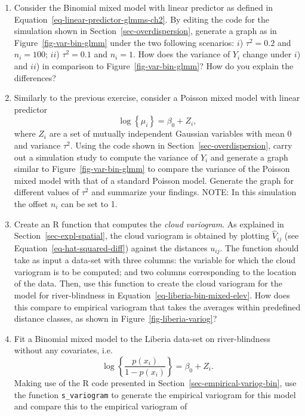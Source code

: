 \documentclass[
  letterpaper,
]{krantz}
\begin{document}
\begin{enumerate}
\def\labelenumi{\arabic{enumi}.}
\setcounter{enumi}{1}
\item
  Consider the Binomial mixed model with linear predictor as defined in
  Equation~\ref{eq-linear-predictor-glmms-ch2}. By editing the code for
  the simulation shown in Section~\ref{sec-overdispersion}, generate a
  graph as in Figure~\ref{fig-var-bin-glmm} under the two following
  scenarios: \(i\)) \(\tau^2 = 0.2\) and \(n_i=100\); \(ii\))
  \(\tau^2 = 0.1\) and \(n_i = 1\). How does the variance of \(Y_i\)
  change under \(i\)) and \(ii\)) in comparison to
  Figure~\ref{fig-var-bin-glmm}? How do you explain the differences?
\item
  Similarly to the previous exercise, consider a Poisson mixed model
  with linear predictor \[
  \log\left\{\mu_i\right\} = \beta_0 + Z_i,
  \] where \(Z_i\) are a set of mutually independent Gaussian variables
  with mean 0 and variance \(\tau^2\). Using the code shown in
  Section~\ref{sec-overdispersion}, carry out a simulation study to
  compute the variance of \(Y_i\) and generate a graph similar to
  Figure~\ref{fig-var-bin-glmm} to compare the variance of the Poisson
  mixed model with that of a standard Poisson model. Generate the graph
  for different values of \(\tau^2\) and summarize your findings. NOTE:
  In this simulation the offset \(n_i\) can be set to 1.
\item
  Create an R function that computes the \emph{cloud variogram}. As
  explained in Section~\ref{sec-expl-spatial}, the cloud variogram is
  obtained by plotting \(\hat{V}_{ij}\) (see
  Equation~\ref{eq-hat-squared-diff}) against the distances \(u_{ij}\).
  The function should take as input a data-set with three columns: the
  variable for which the cloud variogram is to be computed; and two
  columns corresponding to the location of the data. Then, use this
  function to create the cloud variogram for the model for
  river-blindness in Equation~\ref{eq-liberia-bin-mixed-elev}. How does
  this compare to empirical variogram that takes the averages within
  predefined distance classes, as shown in
  Figure~\ref{fig-liberia-variog}?
\item
  Fit a Binomial mixed model to the Liberia data-set on river-blindness
  without any covariates, i.e.~\[
  \log\left\{\frac{p(x_i)}{1-p(x_i)}\right\} = \beta_0 + Z_i.
  \] Making use of the R code presented in
  Section~\ref{sec-empirical-variog-bin}, use the function
  \texttt{s\_variogram} to generate the empirical variogram for this
  model and compare this to the empirical variogram of

\end{enumerate}
\end{document}
